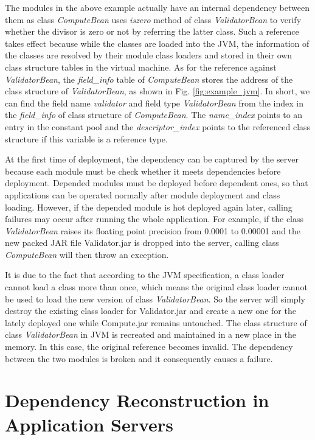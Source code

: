 \documentclass[conference]{IEEEtran}
\begin{document}
The modules in the above example actually have an internal dependency between them as class \emph{ComputeBean} uses \emph{iszero} method of class \emph{ValidatorBean} to verify whether the divisor is zero or not by referring the latter class. Such a reference takes effect because while the classes are loaded into the JVM\cite{jvm}, the information of the classes are resolved by their module class loaders and stored in their own class structure tables in the virtual machine. As for the reference against \emph{ValidatorBean}, the \emph{field\_info} table of \emph{ComputeBean} stores the address of the class structure of \emph{ValidatorBean}, as shown in Fig. \ref{fig:example_jvm}. In short, we can find the field name \emph{validator} and field type \emph{ValidatorBean} from the index in the \emph{field\_info} of class structure of \emph{ComputeBean}. 
The \emph{name\_index} points to an entry in the constant pool and the \emph{descriptor\_index} points to the referenced class structure if this variable is a reference type\cite{jvm_book}. 

At the first time of deployment, the dependency can be captured by the server because each module must be check whether it meets dependencies before deployment. Depended modules must be deployed before dependent ones, so that applications can be operated normally after module deployment and class loading. However, if the depended module is hot deployed again later, calling failures may occur after running the whole application. For example, if the class \emph{ValidatorBean} raises its floating point precision from 0.0001 to 0.00001 and the new packed JAR file Validator.jar is dropped into the server, calling class \emph{ComputeBean} will then throw an exception. 

It is due to the fact that according to the JVM specification\cite{jvm_specification}, a class loader cannot load a class more than once, which means the original class loader cannot be used to load the new version of class \emph{ValidatorBean}. So the server will simply destroy the existing class loader for Validator.jar and create a new one for the lately deployed one while Compute.jar remains untouched. The class structure of class \emph{ValidatorBean} in JVM is recreated and maintained in a new place in the memory. In this case, the original reference becomes invalid. The dependency between the two modules is broken and it consequently causes a failure.


\section{Dependency Reconstruction in Application Servers\label{sec:reconstructionAS}}
\end{document}
